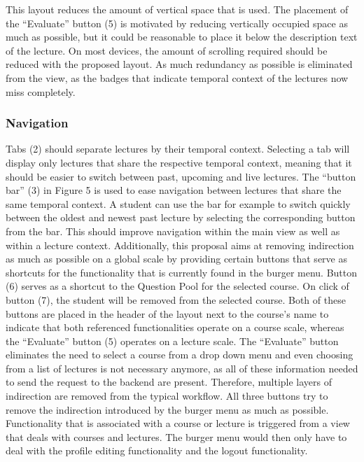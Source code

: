 This layout reduces the amount of vertical space that is used. The placement of the “Evaluate” button (5) is motivated by reducing vertically occupied space as much as possible, but it could be reasonable to place it below the description text of the lecture. On most devices, the amount of scrolling required should be reduced with the proposed layout. As much redundancy as possible is eliminated from the view, as the badges that indicate temporal context of the lectures now miss completely.

\subsubsection{Navigation}
Tabs (2) should separate lectures by their temporal context. Selecting a tab will display only lectures that share the respective temporal context, meaning that it should be easier to switch between past, upcoming and live lectures.
The “button bar” (3) in Figure 5 is used to ease navigation between lectures that share the same temporal context. A student can use the bar for example to switch quickly between the oldest and newest past lecture by selecting the corresponding button from the bar. This should improve navigation within the main view as well as within a lecture context. 
Additionally, this proposal aims at removing indirection as much as possible on a global scale by providing certain buttons that serve as shortcuts for the functionality that is currently found in the burger menu. Button (6) serves as a shortcut to the Question Pool for the selected course. On click of button (7), the student will be removed from the selected course. Both of these buttons are placed in the header of the layout next to the course’s name to indicate that both referenced functionalities operate on a course scale, whereas the “Evaluate” button (5) operates on a lecture scale. The “Evaluate” button eliminates the need to select a course from a drop down menu and even choosing from a list of lectures is not necessary anymore, as all of these information needed to send the request to the backend are present. Therefore, multiple layers of indirection are removed from the typical workflow. All three buttons try to remove the indirection introduced by the burger menu as much as possible. Functionality that is associated with a course or lecture is triggered from a view that deals with courses and lectures. The burger menu would then only have to deal with the profile editing functionality and the logout functionality.

